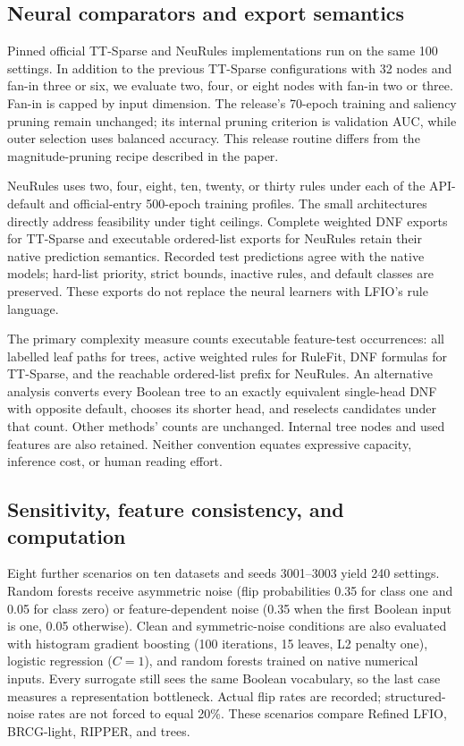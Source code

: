 \documentclass[a4paper,fleqn,review]{cas-sc}
\begin{document}
\subsection{Neural comparators and export semantics}
Pinned official TT-Sparse and NeuRules implementations run on the same 100 settings. In addition to the previous TT-Sparse configurations with 32 nodes and fan-in three or six, we evaluate two, four, or eight nodes with fan-in two or three. Fan-in is capped by input dimension. The release's 70-epoch training and saliency pruning remain unchanged; its internal pruning criterion is validation AUC, while outer selection uses balanced accuracy. This release routine differs from the magnitude-pruning recipe described in the paper.

NeuRules uses two, four, eight, ten, twenty, or thirty rules under each of the API-default and official-entry 500-epoch training profiles. The small architectures directly address feasibility under tight ceilings. Complete weighted DNF exports for TT-Sparse and executable ordered-list exports for NeuRules retain their native prediction semantics. Recorded test predictions agree with the native models; hard-list priority, strict bounds, inactive rules, and default classes are preserved. These exports do not replace the neural learners with LFIO's rule language.

The primary complexity measure counts executable feature-test occurrences: all labelled leaf paths for trees, active weighted rules for RuleFit, DNF formulas for TT-Sparse, and the reachable ordered-list prefix for NeuRules. An alternative analysis converts every Boolean tree to an exactly equivalent single-head DNF with opposite default, chooses its shorter head, and reselects candidates under that count. Other methods' counts are unchanged. Internal tree nodes and used features are also retained. Neither convention equates expressive capacity, inference cost, or human reading effort.

\subsection{Sensitivity, feature consistency, and computation}
Eight further scenarios on ten datasets and seeds 3001--3003 yield 240 settings. Random forests receive asymmetric noise (flip probabilities 0.35 for class one and 0.05 for class zero) or feature-dependent noise (0.35 when the first Boolean input is one, 0.05 otherwise). Clean and symmetric-noise conditions are also evaluated with histogram gradient boosting (100 iterations, 15 leaves, L2 penalty one), logistic regression ($C=1$), and random forests trained on native numerical inputs. Every surrogate still sees the same Boolean vocabulary, so the last case measures a representation bottleneck. Actual flip rates are recorded; structured-noise rates are not forced to equal 20\%. These scenarios compare Refined LFIO, BRCG-light, RIPPER, and trees.
\end{document}
